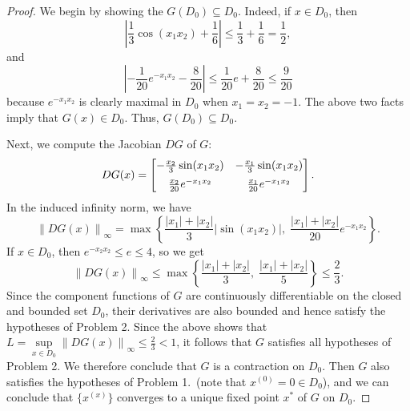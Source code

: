 \documentclass{homework}
\newcommand{\pow}[1]{^{\left(#1\right)}}
\newcommand{\norm}[1]{\left\lVert{#1}\right\rVert}
\begin{document}
	\begin{proof}
		We begin by showing the $G(D_0) \subseteq D_0$. Indeed, if $x \in D_0$, then
		\begin{equation*}
			\left|\frac{1}{3}\cos(x_1x_2) + \frac{1}{6}\right| \le \frac{1}{3} + \frac{1}{6} = \frac{1}{2},
		\end{equation*}
		and
		\begin{equation*}
			\left|-\frac{1}{20}e^{-x_1x_2}-\frac{8}{20}\right| \le \frac{1}{20}e + \frac{8}{20} \le \frac{9}{20}
		\end{equation*}
		because $e^{-x_1x_2}$ is clearly maximal in $D_0$ when $x_1=x_2=-1$. The above two facts imply that $G(x) \in D_0$. Thus, $G(D_0) \subseteq D_0$.
		
		Next, we compute the Jacobian $DG$ of $G$:
		\begin{equation*}
			DG(x) = \left[\begin{matrix}-\frac{x_2}{3}\sin(x_1x_2) & -\frac{x_1}{3}\sin(x_1x_2) \\[0.5em] \frac{x_2}{20}e^{-x_1x_2} & \frac{x_1}{20}e^{-x_1x_2}\end{matrix}\right].
		\end{equation*}
		In the induced infinity norm, we have
		\begin{equation*}
			\norm{DG(x)}_\infty = \max\left\{\frac{|x_1| + |x_2|}{3}|\sin(x_1x_2)|,\; \frac{|x_1| + |x_2|}{20}e^{-x_1x_2}\right\}.
		\end{equation*}
		If $x \in D_0$, then $e^{-x_2x_2} \le e \le 4$, so we get
		\begin{equation*}
			\norm{DG(x)}_\infty \le \max\left\{\frac{|x_1| + |x_2|}{3},\; \frac{|x_1|+|x_2|}{5}\right\} \le \frac{2}{3}.
		\end{equation*}
		Since the component functions of $G$ are continuously differentiable on the closed and bounded set $D_0$, their derivatives are also bounded and hence satisfy the hypotheses of Problem 2. Since the above shows that $L = \sup\limits_{x\in D_0}\norm{DG(x)}_\infty \le \frac{2}{3} < 1$, it follows that $G$ satisfies all hypotheses of Problem 2. We therefore conclude that $G$ is a contraction on $D_0$. Then $G$ also satisfies the hypotheses of Problem 1.\ (note that $x\pow{0} = 0 \in D_0$), and we can conclude that $\big\{x\pow{x}\big\}$ converges to a unique fixed point $x^*$ of $G$ on $D_0$.
	\end{proof}
	
\end{document}
